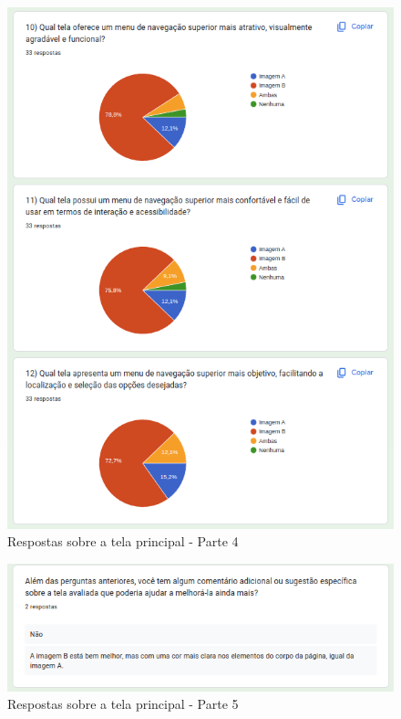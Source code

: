 \begin{figure}[!h]
	\begin{center}
	    \includegraphics[scale=0.5]{figs/Answers/Students/15.png}
	\end{center}
	\caption{\label{APB_TP04}Respostas sobre a tela principal - Parte 4}
\end{figure}


\begin{figure}[!h]
	\begin{center}
	    \includegraphics[scale=0.5]{figs/Answers/Students/16.png}
	\end{center}
	\caption{\label{APB_TP05}Respostas sobre a tela principal - Parte 5}
\end{figure}

